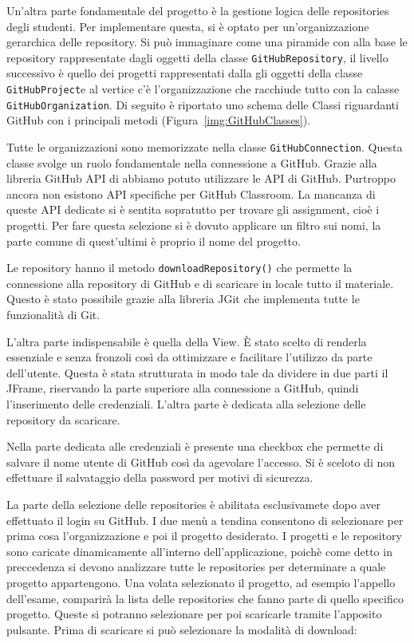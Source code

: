 		Un'altra parte fondamentale del progetto è la gestione logica delle repositories degli studenti.
		Per implementare questa, si è optato per un'organizzazione gerarchica delle repository.
		Si può immaginare come una piramide con alla base le repository rappresentate dagli oggetti della classe \verb|GitHubRepository|, il livello successivo è quello dei progetti rappresentati dalla gli oggetti della classe \verb|GitHubProject|e al vertice c'è l'organizzazione che racchiude tutto con la calasse \verb|GitHubOrganization|.
		Di seguito è riportato uno schema delle Classi riguardanti GitHub con i principali metodi (Figura~\ref{img:GitHubClasses}).
		
		\begin{center}
			\label{img:GitHubClasses}
		\end{center}
		
		
		Tutte le organizzazioni sono memorizzate nella classe \verb|GitHubConnection|.
		Questa classe svolge un ruolo fondamentale nella connessione a GitHub. Grazie alla libreria GitHub API di \citep{GitHubAPI} abbiamo potuto utilizzare le API di GitHub.
		Purtroppo ancora non esistono API specifiche per GitHub Classroom. La mancanza di queste API dedicate si è sentita sopratutto per trovare gli assignment, cioè i progetti. Per fare questa selezione si è dovuto applicare un filtro sui nomi, la parte comune di quest'ultimi è proprio il nome del progetto.
		
		Le repository hanno il metodo \verb|downloadRepository()| che permette la connessione alla repository di GitHub e di scaricare in locale tutto il materiale. Questo è stato possibile grazie alla libreria JGit che implementa tutte le funzionalità di Git.
		
		L'altra parte indispensabile è quella della View.
		\`E stato scelto di renderla essenziale e senza fronzoli così da ottimizzare e facilitare l'utilizzo da parte dell'utente.
		Questa è stata strutturata in modo tale da dividere in due parti il JFrame, riservando la parte superiore alla connessione a GitHub, quindi l'inserimento delle credenziali. L'altra parte è dedicata alla selezione delle repository da scaricare.
		
		Nella parte dedicata alle credenziali è presente una checkbox che permette di salvare il nome utente di GitHub così da agevolare l'accesso. Si è sceloto di non effettuare il salvataggio della password per motivi di sicurezza.
		
		La parte della selezione delle repositories è abilitata esclusivamete dopo aver effettuato il login su GitHub. I due menù a tendina consentono di selezionare per prima cosa l'organizzazione e poi il progetto desiderato.
		I progetti e le repository sono caricate dinamicamente all'interno dell'applicazione, poichè come detto in preccedenza si devono analizzare tutte le repositories per determinare a quale progetto appartengono.
		Una volata selezionato il progetto, ad esempio l'appello dell'esame, comparirà la lista delle repositories che fanno parte di quello specifico progetto. Queste si potranno selezionare per poi scaricarle tramite l'apposito pulsante.
		Prima di scaricare si può selezionare la modalità di download:
		
